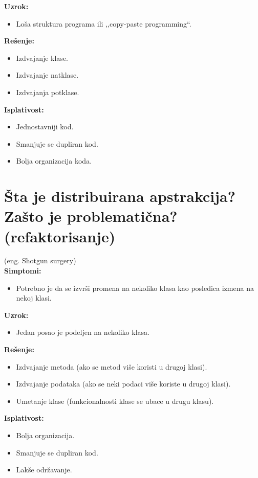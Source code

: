 \documentclass[a4paper]{article}
\begin{document}
  \noindent \textbf{Uzrok:} 
  \begin{itemize}
    \item Loša struktura programa ili ,,copy-paste programming``.
  \end{itemize}

  \noindent \textbf{Rešenje:} 
  \begin{itemize}
    \item Izdvajanje klase.
    \item Izdvajanje natklase.
    \item Izdvajanja potklase.
  \end{itemize}

  \noindent \textbf{Isplativost:} 
  \begin{itemize}
    \item Jednostavniji kod.
    \item Smanjuje se dupliran kod.
    \item Bolja organizacija koda.
  \end{itemize}

\section{Šta je distribuirana apstrakcija? Zašto je problematična? (refaktorisanje)}
  (eng. Shotgun surgery)\\
  \textbf{Simptomi:}
  \begin{itemize}
    \item Potrebno je da se izvrši promena na nekoliko klasa kao posledica izmena na nekoj klasi.
  \end{itemize}

  \noindent \textbf{Uzrok:} 
  \begin{itemize}
    \item Jedan posao je podeljen na nekoliko klasa. 
  \end{itemize}

  \noindent \textbf{Rešenje:} 
  \begin{itemize}
    \item Izdvajanje metoda (ako se metod više koristi u drugoj klasi).
    \item Izdvajanje podataka (ako se neki podaci više koriste u drugoj klasi).
    \item Umetanje klase (funkcionalnosti klase se ubace u drugu klasu).
  \end{itemize}

  \noindent \textbf{Isplativost:} 
  \begin{itemize}
    \item Bolja organizacija.
    \item Smanjuje se dupliran kod.
    \item Lakše održavanje.
  \end{itemize}
\end{document}

